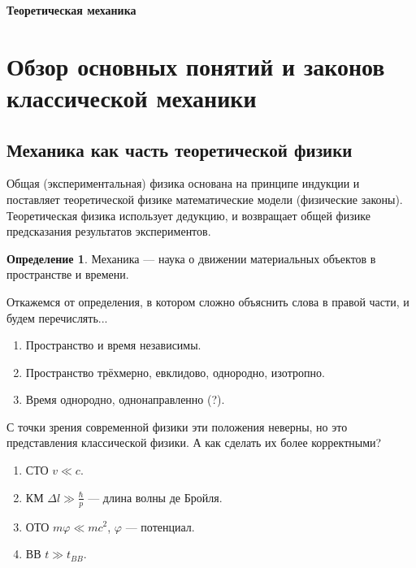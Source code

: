 \documentclass[12pt]{article}
\begin{document}
\renewcommand{\cftsecaftersnum}{.}
\renewcommand{\cftsubsecaftersnum}{.}

\renewcommand\refname{Список литературы}

\theoremstyle{plain}
\newtheorem{thm}{Теорема}[section]

\theoremstyle{definition}
\newtheorem{dfn}{Определение}[section]
\newtheorem{cns}[thm]{Следствие}

\theoremstyle{remark}
\newtheorem{task}{Задача}[section]
\newtheorem{ex}{Пример}[subsection]
\newtheorem{cex}[ex]{Контрпример}
\newtheorem{rmk}{Замечание}[subsection]

\newcommand{\eqdef}{\stackrel{\mathrm{def}}{=}}

\begin{center}
\Huge{\textbf{Теоретическая механика}}
\end{center}
\tableofcontents
\newpage
\section{Обзор основных понятий и законов классической механики}
\subsection{Механика как часть теоретической физики}
Общая (экспериментальная) физика основана на принципе индукции и поставляет теоретической физике математические модели (физические законы). Теоретическая физика использует дедукцию, и возвращает общей физике предсказания результатов экспериментов.

\begin{dfn} Механика --- наука о движении материальных объектов в пространстве и времени. \end{dfn}
Откажемся от определения, в котором сложно объяснить слова в правой части, и будем перечислять...
\begin{enumerate}
\item Пространство и время независимы.
\item Пространство трёхмерно, евклидово, однородно, изотропно.
\item Время однородно, однонаправленно (?).
\end{enumerate}
С точки зрения современной физики эти положения неверны, но это представления классической физики. А как сделать их более корректными?
\begin{enumerate}
\item СТО $v \ll c$.
\item КМ $\Delta l \gg \frac{\hbar}{p}$ --- длина волны де Бройля.
\item ОТО $m \varphi \ll mc^2$, $\varphi$ --- потенциал.
\item ВВ $t \gg t_{BB}$.
\end{enumerate}
\end{document}

